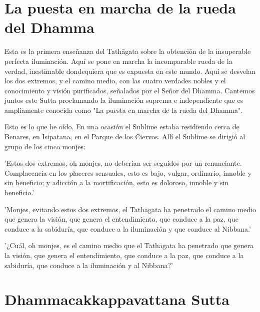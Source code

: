 \chapterTocDelegatePageNumber
\chapter{La puesta en marcha de la rueda del Dhamma}

\setTocDelegatedPageNumber
\englishText
\renewcommand{\englishTitle}{La puesta en marcha de la rueda del Dhamma}

\begin{leader}

Esta es la primera enseñanza del Tathāgata sobre la obtención de la insuperable perfecta iluminación.
Aquí se pone en marcha la incomparable rueda de la verdad, inestimable dondequiera que es expuesta en este mundo.
Aquí se desvelan los dos extremos, y el camino medio, con las cuatro verdades nobles y el conocimiento y visión purificados, señalados por el Señor del Dhamma.
Cantemos juntos este Sutta proclamando la iluminación suprema e independiente que es ampliamente conocida como "La puesta en marcha de la rueda del Dhamma".


\end{leader}


Esto es lo que he oído. En una ocasión el Sublime estaba residiendo cerca de Benares, en Isipatana, en el Parque de los Ciervos. Allí el Sublime se dirigió al grupo de los cinco monjes:

'Estos dos extremos, oh monjes, no deberían ser seguidos por un renunciante. Complacencia en los placeres sensuales, esto es bajo, vulgar, ordinario, innoble y sin beneficio; y adicción a la mortificación, esto es doloroso, innoble y sin beneficio.'

'Monjes, evitando estos dos extremos, el Tathāgata ha penetrado el camino medio que genera la visión, que genera el entendimiento, que conduce a la paz, que conduce a la sabiduría, que conduce a la iluminación y que conduce al Nibbana.'

'¿Cuál, oh monjes, es el camino medio que el Tathāgata ha penetrado que genera la visión, que genera el entendimiento, que conduce a la paz, que conduce a la sabiduría, que conduce a la iluminación y al Nibbana?'



\chapterTocSubIndentTrue
\chapter{Dhammacakkappavattana Sutta}

